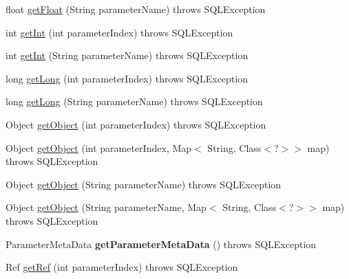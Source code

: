 \begin{DoxyCompactItemize}
\item 
float \mbox{\hyperlink{classcom_1_1mysql_1_1cj_1_1jdbc_1_1_callable_statement_a60fdd6135ca3dd6e54bdb7ff62175103}{get\+Float}} (String parameter\+Name)  throws S\+Q\+L\+Exception 
\item 
int \mbox{\hyperlink{classcom_1_1mysql_1_1cj_1_1jdbc_1_1_callable_statement_ae1c1a3f79f99f2dd61c551a5579f9d00}{get\+Int}} (int parameter\+Index)  throws S\+Q\+L\+Exception 
\item 
int \mbox{\hyperlink{classcom_1_1mysql_1_1cj_1_1jdbc_1_1_callable_statement_a4685a7930f62ecaf6dbb1e0153809238}{get\+Int}} (String parameter\+Name)  throws S\+Q\+L\+Exception 
\item 
long \mbox{\hyperlink{classcom_1_1mysql_1_1cj_1_1jdbc_1_1_callable_statement_a6c377cb8bf737e797f7b1997b1720f20}{get\+Long}} (int parameter\+Index)  throws S\+Q\+L\+Exception 
\item 
long \mbox{\hyperlink{classcom_1_1mysql_1_1cj_1_1jdbc_1_1_callable_statement_a91e4b1905100f823247b0670dfeab198}{get\+Long}} (String parameter\+Name)  throws S\+Q\+L\+Exception 
\item 
Object \mbox{\hyperlink{classcom_1_1mysql_1_1cj_1_1jdbc_1_1_callable_statement_a9f21c0d55e0a2c4361e1d57500a6c06f}{get\+Object}} (int parameter\+Index)  throws S\+Q\+L\+Exception 
\item 
Object \mbox{\hyperlink{classcom_1_1mysql_1_1cj_1_1jdbc_1_1_callable_statement_a97844ead20095c7f99ec8dda55fcb795}{get\+Object}} (int parameter\+Index, Map$<$ String, Class$<$?$>$$>$ map)  throws S\+Q\+L\+Exception 
\item 
Object \mbox{\hyperlink{classcom_1_1mysql_1_1cj_1_1jdbc_1_1_callable_statement_a6166a1c8cd33dbb53750d37513d29365}{get\+Object}} (String parameter\+Name)  throws S\+Q\+L\+Exception 
\item 
Object \mbox{\hyperlink{classcom_1_1mysql_1_1cj_1_1jdbc_1_1_callable_statement_a367ba176bf87e7f1ec648719163ccfe1}{get\+Object}} (String parameter\+Name, Map$<$ String, Class$<$?$>$$>$ map)  throws S\+Q\+L\+Exception 
\item 
\mbox{\label{classcom_1_1mysql_1_1cj_1_1jdbc_1_1_callable_statement_a7de827ba1f1043c4f4fcaf93da15305e}} 
Parameter\+Meta\+Data {\bfseries get\+Parameter\+Meta\+Data} ()  throws S\+Q\+L\+Exception 
\item 
Ref \mbox{\hyperlink{classcom_1_1mysql_1_1cj_1_1jdbc_1_1_callable_statement_a8720b2b1d80bf651acaa37a231a54a2f}{get\+Ref}} (int parameter\+Index)  throws S\+Q\+L\+Exception 

\end{DoxyCompactItemize}
